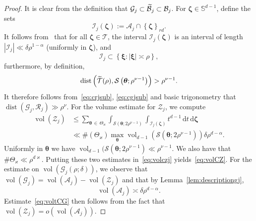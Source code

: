 \documentclass[AHL,Unicode,longabstracts,published]{cedram}
\DeclareMathOperator{\vol}{vol}
\DeclareMathOperator{\dist}{dist}
\newcommand{\de}{\, \mathrm{d}}
\newcommand{\BBS}{\mathbb S}
\newcommand{\CA}{\mathcal{A}}
\newcommand{\CB}{\mathcal{B}}
\newcommand{\CG}{\mathcal{G}}
\newcommand{\CI}{\mathcal{I}}
\newcommand{\CR}{\mathcal{R}}
\newcommand{\CS}{\mathcal{S}}
\newcommand{\CT}{\mathcal{T}}
\newcommand{\CZ}{\mathcal{Z}}
\newcommand{\btheta}{\boldsymbol \theta}
\newcommand{\bzeta}{\boldsymbol \zeta}
\newcommand{\bxi}{\boldsymbol \xi}
\newcommand{\smallo}[1]{o\left(#1 \right)}
\newcommand{\abs}[1]{\left\lvert #1 \right\rvert}
\newcommand{\set}[1]{\left\{ #1 \right\}}
\let\oldtilde\tilde
\renewcommand*{\tilde}[1]{\mathchoice{\widetilde{#1}}{\widetilde{#1}}{\oldtilde{#1}}{\oldtilde{#1}}}
\begin{document}
\begin{proof}
It is clear from the definition that $\CG_j \subset \tilde \CB_j \subset
\CB_j$. For $\bzeta \in \BBS^{d-1}$, define the sets
\begin{equation}
\CI_j(\bzeta) := \CA_j \cap \set{\bzeta}_{rd}.
\end{equation}
It follows from~\cite[Equation (8.5)]{ParSob2010} that for all $\bzeta \in
\CT$, the interval $\CI_j(\bzeta)$ is an interval of length $\abs{\CI_j} \ll \delta
\rho^{1 - \alpha}$ (uniformly in $\bzeta$), and
\begin{equation}
\CI_j \subset \set{\bxi : \abs \bxi \asymp \rho },
\end{equation}
furthermore, by definition,
\[
\dist\left(\tilde \CT(\rho), \CS\left(\btheta;\rho^{\nu -1}\right)\right) > \rho^{\nu -1 }.
\]
It therefore follows from~\eqref{eq:crjsub}, \eqref{eq:cgjsub} and basic trigonometry that $\dist(\CG_j,\CR_j) \gg \rho^{\nu}$. For the volume estimate for $\CZ_j$, we compute
\begin{equation}\label{eq:volczj}
\begin{aligned}
\vol(\CZ_j) &\le \sum_{\btheta\,\in\,\Theta_\varkappa} \int_{
\CS\left(\btheta;2 \rho^{\nu - 1}\right)} \int_{\CI_j(\bzeta)} t^{d-1} \de t \de \bzeta \\
& \ll \#(\Theta_\varkappa)\max_{\btheta}\vol_{d-1}\left(
\CS\left(\btheta;2\rho^{\nu-1}\right)\right)\delta\rho^{d - \alpha}.
\end{aligned}
\end{equation}
Uniformly in $\btheta$ we have $\vol_{d-1}(
\CS(\btheta;2\rho^{\nu-1}) \ll \rho^{\nu-1}$. We also have that $\#\Theta_\varkappa \ll
\rho^{d\varkappa}$. Putting these two estimates in~\eqref{eq:volczj} yields~\eqref{eq:volCZ}. For the estimate on $\vol(\CG_j(\rho;\delta))$, we observe that $\vol(\CG_j) = \vol(\CA_j) - \vol(\CZ_j)$ and that by Lemma~\ref{lem:descriptiongj},
\begin{equation}
\vol(\CA_j) \asymp \delta \rho^{d - \alpha}.
\end{equation}
Estimate~\eqref{eq:voltCG} then follows from the fact that $\vol(\CZ_j) =
\smallo{\vol(\CA_j)}$.
\end{proof}
\end{document}
